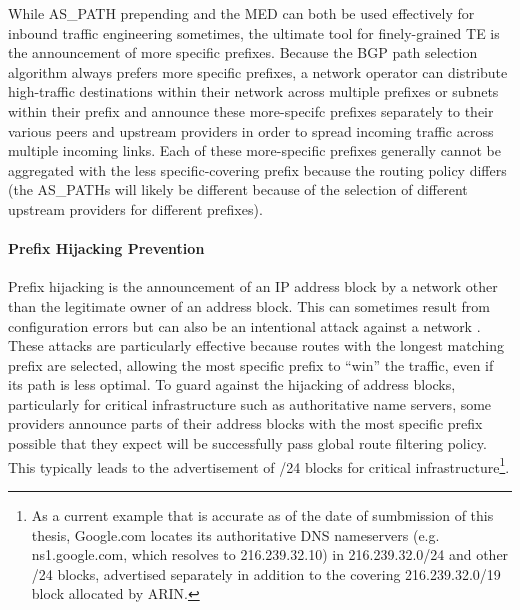 While AS\_PATH prepending and the MED can both be used effectively for inbound
traffic engineering sometimes, the ultimate tool for finely-grained TE is the
announcement of more specific prefixes. Because the BGP path selection
algorithm always prefers more specific prefixes, a network operator can
distribute high-traffic destinations within their network across multiple
prefixes or subnets within their prefix and announce these more-specifc
prefixes separately to their various peers and upstream providers in order to
spread incoming traffic across multiple incoming links. Each of these
more-specific prefixes generally cannot be aggregated with the less
specific-covering prefix because the routing policy differs (the AS\_PATHs will
likely be different because of the selection of different upstream providers
for different prefixes).



\paragraph{Prefix Hijacking Prevention}

Prefix hijacking is the announcement of an IP address block by a network other
than the legitimate owner of an address block. This can sometimes result from
configuration errors \cite{Brown:2008hc} but can also be an intentional attack
against a network \cite{Pilosov:2008ij}. These attacks are particularly
effective because routes with the longest matching prefix are selected,
allowing the most specific prefix to ``win'' the traffic, even if its path is
less optimal. To guard against the hijacking of address blocks, particularly
for critical infrastructure such as authoritative name servers, some providers
announce parts of their address blocks with the most specific prefix
possible that they expect will be successfully pass global route filtering
policy. This typically leads to the advertisement of /24 blocks for
critical infrastructure\footnote{As a current example that is accurate as
of the date of sumbmission of this thesis, Google.com locates its
authoritative DNS nameservers (e.g. ns1.google.com, which resolves to
216.239.32.10) in 216.239.32.0/24 and other /24 blocks, advertised
separately in addition to the covering 216.239.32.0/19 block allocated by
ARIN.}.

